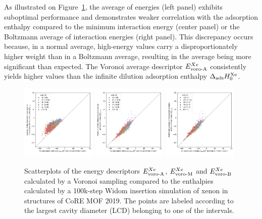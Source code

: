 \documentclass[main]{subfiles}
\begin{document}
As illustrated on Figure~\ref{fgr:compa_voro_0}, the average of energies (left panel) exhibits suboptimal performance and demonstrates weaker correlation with the adsorption enthalpy compared to the minimum interaction energy (center panel) or the Boltzmann average of interaction energies (right panel). This discrepancy occurs because, in a normal average, high-energy values carry a disproportionately higher weight than in a Boltzmann average, resulting in the average being more significant than expected. The Voronoi average descriptor $E_{\text{voro-A}}^{Xe}$ consistently yields higher values than the infinite dilution adsorption enthalpy $\Delta_{\text{ads}} H_{0}^{\text{Xe}}$. 

\begin{figure}[ht]
  \centering
    \includegraphics[width=0.32\textwidth]{figures/3-fastsim/H_Xe_0_vs_E_voro_A_overview.jpg}
    \includegraphics[width=0.32\textwidth]{figures/3-fastsim/H_Xe_0_vs_E_voro_M_overview.jpg}
    \includegraphics[width=0.32\textwidth]{figures/3-fastsim/H_Xe_0_vs_E_voro_B_overview.jpg}
    \caption{Scatterplots of the energy descriptors $E_{\text{voro-A}}^{Xe}$, $E_{\text{voro-M}}^{Xe}$ and $E_{\text{voro-B}}^{Xe}$ calculated by a Voronoi sampling compared to the enthalpies calculated by a 100k-step Widom insertion simulation of xenon in structures of CoRE MOF 2019. The points are labeled according to the largest cavity diameter (LCD) belonging to one of the intervals.}\label{fgr:compa_voro_0}
\end{figure}
\end{document}
